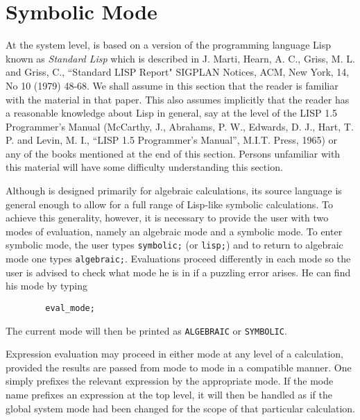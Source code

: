 \chapter{Symbolic Mode}

\hypertarget{target:modes}{}
\hypertarget{reserved:LISP}{}

At the system level, {\REDUCE} is based on a version of the programming
language Lisp known as {\em Standard Lisp\/} which is described
in J. Marti, Hearn, A. C., Griss, M. L. and Griss, C., ``Standard LISP
Report" SIGPLAN Notices, ACM, New York, 14, No 10 (1979) 48-68.  We shall
assume in this section that the reader is familiar with the material in
that paper.  This also assumes implicitly that the reader has a reasonable
knowledge about Lisp in general, say at the level of the LISP 1.5
Programmer's Manual (McCarthy, J., Abrahams, P. W., Edwards, D. J., Hart,
T. P. and Levin, M. I., ``LISP 1.5 Programmer's Manual'', M.I.T.  Press,
1965) or any of the books mentioned at the end of this section.  Persons
unfamiliar with this material will have some difficulty understanding this
section.

Although {\REDUCE} is designed primarily for algebraic calculations, its
source language is general enough to allow for a full range of Lisp-like
symbolic calculations.  To achieve this generality, however, it is
necessary to provide the user with two modes of evaluation, namely an
algebraic mode and a symbolic mode. To enter symbolic mode, the user types {\tt symbolic;}
 (or {\tt lisp;}) and to return to
algebraic mode one types {\tt algebraic;}.
Evaluations proceed differently in each mode so the user is advised to
check what mode he is in if a puzzling error arises.  He can find his mode
by typing

\begin{verbatim}
        eval_mode;
\end{verbatim}
The current mode will then be printed as {\tt ALGEBRAIC} or {\tt SYMBOLIC}.

Expression evaluation may proceed in either mode at any level of a
calculation, provided the results are passed from mode to mode in a
compatible manner. One simply prefixes the relevant expression by the
appropriate mode. If the mode name prefixes an expression at the top
level, it will then be handled as if the global system mode had been
changed for the scope of that particular calculation.

